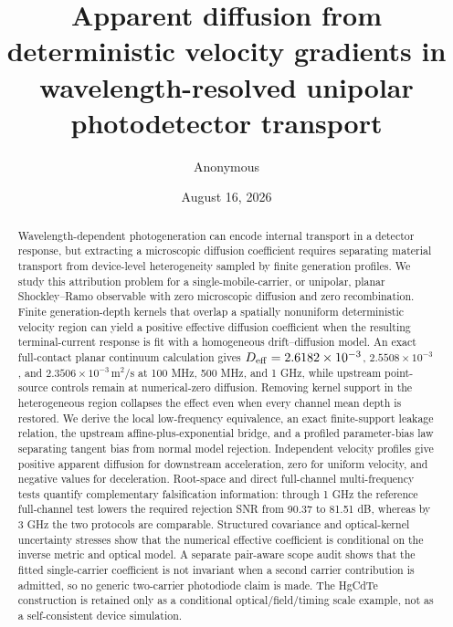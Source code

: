 \documentclass[aps,pra,twocolumn,superscriptaddress,nofootinbib]{revtex4-2}
\begin{document}
\title{Apparent diffusion from deterministic velocity gradients in wavelength-resolved unipolar photodetector transport}

\author{Anonymous}

\date{August 16, 2026}

\begin{abstract}
Wavelength-dependent photogeneration can encode internal transport in a detector response, but extracting a microscopic diffusion coefficient requires separating material transport from device-level heterogeneity sampled by finite generation profiles. We study this attribution problem for a single-mobile-carrier, or unipolar, planar Shockley--Ramo observable with zero microscopic diffusion and zero recombination. Finite generation-depth kernels that overlap a spatially nonuniform deterministic velocity region can yield a positive effective diffusion coefficient when the resulting terminal-current response is fit with a homogeneous drift--diffusion model. An exact full-contact planar continuum calculation gives $D_{\rm eff}=2.6182\times10^{-3}$, $2.5508\times10^{-3}$, and $2.3506\times10^{-3}\,\mathrm{m^2/s}$ at 100 MHz, 500 MHz, and 1 GHz, while upstream point-source controls remain at numerical-zero diffusion. Removing kernel support in the heterogeneous region collapses the effect even when every channel mean depth is restored. We derive the local low-frequency equivalence, an exact finite-support leakage relation, the upstream affine-plus-exponential bridge, and a profiled parameter-bias law separating tangent bias from normal model rejection. Independent velocity profiles give positive apparent diffusion for downstream acceleration, zero for uniform velocity, and negative values for deceleration. Root-space and direct full-channel multi-frequency tests quantify complementary falsification information: through 1 GHz the reference full-channel test lowers the required rejection SNR from 90.37 to 81.51 dB, whereas by 3 GHz the two protocols are comparable. Structured covariance and optical-kernel uncertainty stresses show that the numerical effective coefficient is conditional on the inverse metric and optical model. A separate pair-aware scope audit shows that the fitted single-carrier coefficient is not invariant when a second carrier contribution is admitted, so no generic two-carrier photodiode claim is made. The HgCdTe construction is retained only as a conditional optical/field/timing scale example, not as a self-consistent device simulation.
\end{abstract}
\end{document}
